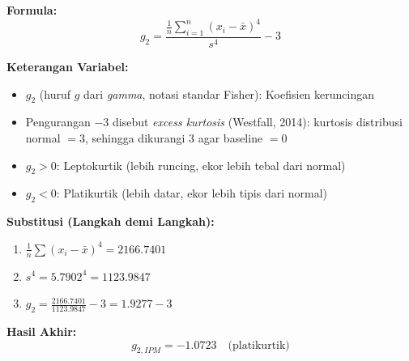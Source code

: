 \documentclass[11pt,a4paper]{article}
\begin{document}
\begin{tcolorbox}[formula_box, title={9. Koefisien Keruncingan / \textit{Excess Kurtosis} ($g_2$)}]
\textbf{Formula:}
\[ g_2 = \frac{\frac{1}{n}\sum_{i=1}^{n}(x_i-\bar{x})^4}{s^4} - 3 \]

\textbf{Keterangan Variabel:}
\begin{itemize}
  \item $g_2$ (huruf $g$ dari \textit{gamma}, notasi standar Fisher): Koefisien keruncingan
  \item Pengurangan $-3$ disebut \textit{excess kurtosis} (Westfall, 2014): kurtosis distribusi normal $= 3$, sehingga dikurangi 3 agar baseline $= 0$
  \item $g_2 > 0$: Leptokurtik (lebih runcing, ekor lebih tebal dari normal)
  \item $g_2 < 0$: Platikurtik (lebih datar, ekor lebih tipis dari normal)
\end{itemize}

\textbf{Substitusi (Langkah demi Langkah):}
\begin{enumerate}
  \item $\frac{1}{n}\sum(x_i-\bar{x})^4 = 2166.7401$
  \item $s^4 = 5.7902^4 = 1123.9847$
  \item $g_2 = \frac{2166.7401}{1123.9847} - 3 = 1.9277 - 3$
\end{enumerate}

\textbf{Hasil Akhir:}
\[ g_{2,IPM} = -1.0723 \quad \text{(platikurtik)} \]
\end{tcolorbox}
\end{document}
